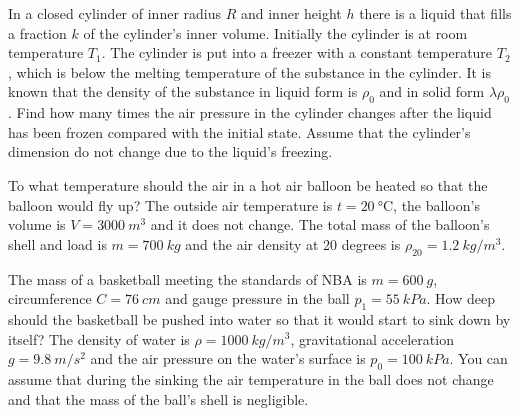 \documentclass[11pt]{article}
\begin{document}

\probeng
In a closed cylinder of inner radius $R$ and inner height $h$ there is a liquid that fills a fraction $k$ of the cylinder's inner volume. Initially the cylinder is at room temperature $T_{1}$. The cylinder is put into a freezer with a constant temperature $T_{2}$, which is below the melting temperature of the substance in the cylinder. It is known that the density of the substance in liquid form is $\rho_0$ and in solid form $\lambda\rho_0$. Find how many times the air pressure in the cylinder changes after the liquid has been frozen compared with the initial state. Assume that the cylinder's dimension do not change due to the liquid’s freezing.
\probend
\bigskip



\bigskip


\probeng
To what temperature should the air in a hot air balloon be heated so that the balloon would fly up? The outside air temperature is $t=\SI{20}{\degreeCelsius}$, the balloon's volume is $V=\SI{3000}{m^3}$ and it does not change. The total mass of the balloon's shell and load is $m=\SI{700}{kg}$ and the air density at 20 degrees is $\rho_{20}=\SI{1,2}{kg/m^3}$.
\probend
\bigskip


\probeng
The mass of a basketball meeting the standards of NBA is $m=\SI{600}{g}$, circumference $C=\SI{76}{cm}$ and gauge pressure in the ball $p_1=\SI{55}{kPa}$. How deep should the basketball be pushed into water so that it would start to sink down by itself? The density of water is $\rho=\SI{1000}{kg/m^3}$, gravitational acceleration $g=\SI{9,8}{m/s^2}$ and the air pressure on the water's surface is $p_0=\SI{100}{kPa}$. You can assume that during the sinking the air temperature in the ball does not change and that the mass of the ball’s shell is negligible.
\probend
\bigskip

\end{document}
